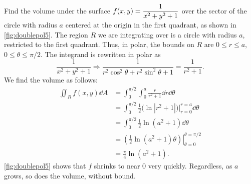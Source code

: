 
\begin{example}\label{ex_doublepol5}%
Find the volume under the surface $\displaystyle f(x,y) =\frac1{x^2+y^2+1}$ over the  sector of the circle with radius $a$ centered at the origin in the first quadrant, as shown in \autoref{fig:doublepol5}.
\solution
The region $R$ we are integrating over is a circle with radius $a$, restricted to the first quadrant. Thus, in polar, the bounds on $R$ are $0\leq r\leq a$, $0\leq\theta\leq\pi/2$. The integrand is rewritten in polar as 
\[
\frac{1}{x^2+y^2+1} \Rightarrow
\frac{1}{r^2\cos^2\theta+r^2\sin^2\theta+1} = \frac1{r^2+1}.
\]
We find the volume as follows:
\begin{align*}
\iint_Rf(x,y)\dd A &= \int_0^{\pi/2}\int_0^a\frac{r}{r^2+1}\dd r\dd\theta\\
		&= \int_0^{\pi/2} \frac12\bigl(\ln|r^2+1|\bigr)\Big|_{r=0}^{r=a}\dd\theta\\
		&=\int_0^{\pi/2} \frac12\ln(a^2+1)\dd\theta\\
		&= \left.\left(\frac12\ln(a^2+1)\theta\right)\right|_{\theta=0}^{\theta=\pi/2}\\
		&= \frac{\pi}{4}\ln(a^2+1).
\end{align*}
\autoref{fig:doublepol5}  shows that $f$ shrinks to near 0 very quickly. Regardless, as $a$ grows, so does the volume, without bound. 
\end{example}

